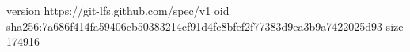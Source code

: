 version https://git-lfs.github.com/spec/v1
oid sha256:7a686f414fa59406cb50383214cf91d4fc8bfef2f77383d9ea3b9a7422025d93
size 174916
